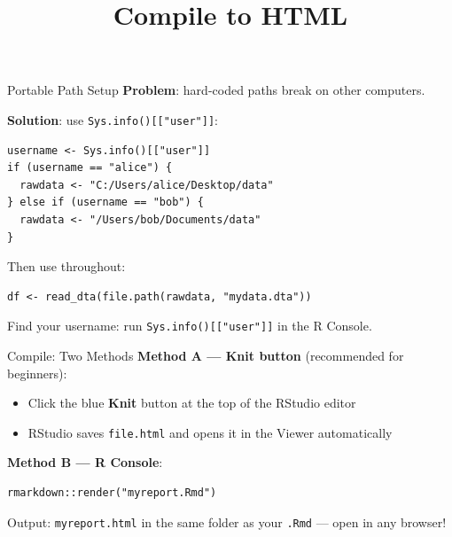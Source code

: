\documentclass[dvipsnames,hyperref={pdfpagelabels=false}]{beamer}
\begin{document}
\begin{frame}[fragile]{Portable Path Setup}
  \textbf{Problem}: hard-coded paths break on other computers.

  \textbf{Solution}: use \texttt{Sys.info()[["user"]]}:

  \begin{lstlisting}[style=rslide]
username <- Sys.info()[["user"]]
if (username == "alice") {
  rawdata <- "C:/Users/alice/Desktop/data"
} else if (username == "bob") {
  rawdata <- "/Users/bob/Documents/data"
}
  \end{lstlisting}

  \vspace{0.3em}
  Then use throughout:
  \begin{lstlisting}[style=rslide]
df <- read_dta(file.path(rawdata, "mydata.dta"))
  \end{lstlisting}

  \vspace{0.3em}
  Find your username: run \texttt{Sys.info()[["user"]]} in the R Console.
\end{frame}

\title[]{Compile to HTML}
\author{}\institute{}\date{}
\begin{frame}{}
  \titlepage
\end{frame}

\begin{frame}[fragile]{Compile: Two Methods}
  \textbf{Method A --- Knit button} (recommended for beginners):
  \begin{itemize}
    \item Click the blue \textbf{Knit} button at the top of the RStudio editor
    \item RStudio saves \texttt{file.html} and opens it in the Viewer automatically
  \end{itemize}

  \vspace{0.8em}
  \textbf{Method B --- R Console}:
  \begin{lstlisting}[style=rslide]
rmarkdown::render("myreport.Rmd")
  \end{lstlisting}

  \vspace{0.5em}
  \begin{center}
    \alert{Output: \texttt{myreport.html} in the same folder as your \texttt{.Rmd}
    --- open in any browser!}
  \end{center}
\end{frame}
\end{document}
